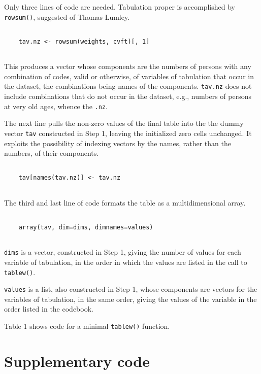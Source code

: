 Only three lines of code are needed. Tabulation proper is accomplished by {\tt rowsum()}, suggested of Thomas Lumley.

\begin{verbatim}

    tav.nz <- rowsum(weights, cvft)[, 1]
	
\end{verbatim}

This produces a vector whose components are the numbers of persons with any combination of codes, valid or otherwise, of variables of tabulation that occur in the dataset, the combinations being names of the components. {\tt tav.nz} does not include combinations that do not occur in the dataset, e.g., numbers of  persons at very old ages, whence the {\tt .nz}.

The next line pulls the non-zero values of the final table into the the dummy vector {\tt tav} constructed in Step 1, leaving the initialized zero cells unchanged. It exploits the possibility of indexing vectors by the names, rather than the numbers, of their components. 

\begin{verbatim}

    tav[names(tav.nz)] <- tav.nz
	
\end{verbatim}

The third and last line of code formats the table as a multidimensional array.

\begin{verbatim}

    array(tav, dim=dims, dimnames=values)
	
\end{verbatim}

{\tt dims} is a vector, constructed in Step 1, giving the number of values for each variable of tabulation, in the order in which the values are listed in the call to {\tt tablew()}.

{\tt values} is a list, also constructed in Step 1, whose components are vectors for the variables of tabulation, in the same order, giving the values of the variable in the order listed in the codebook.

\vspace{12pt}

Table 1 shows code for a minimal {\tt tablew()} function.




\section{Supplementary code}

